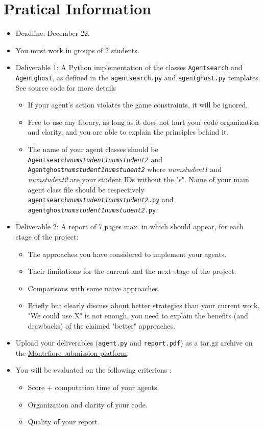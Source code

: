 \documentclass[12pt,a4paper,BCOR12mm, headexclude, footexclude, twoside, openright]{scrartcl}
\newcommand*{\TakeFourierOrnament}[1]{{%
\fontencoding{U}\fontfamily{futs}\selectfont\char#1}}
\newcommand*{\danger}{\TakeFourierOrnament{66}}
\numberwithin{equation}{section} %
\numberwithin{figure}{section} %
\numberwithin{table}{section} %
\begin{document}
\section{Pratical Information}
\begin{itemize}

    \item Deadline: December 22.
    \item You must work in groups of 2 students.
    \item Deliverable 1: A Python implementation of the classes \texttt{Agentsearch} and \texttt{Agentghost}, as defined in the  \texttt{agentsearch.py} and \texttt{agentghost.py} templates. See source code for more details
    \begin{itemize}
    	\item \danger If your agent's action violates the game constraints, it will be ignored,
        \item Free to use any library, as long as it does not hurt your code organization and clarity, and you are able to explain the principles behind it.
        \item The name of your agent classes should be \texttt{Agentsearch\emph{numstudent1}\emph{numstudent2}} and \texttt{Agentghost\emph{numstudent1}\emph{numstudent2}} where \emph{numstudent1} and \emph{numstudent2} are your student IDs without the "s". Name of your main agent class file should be respectively \texttt{agentsearch\emph{numstudent1}\emph{numstudent2}.py} and \texttt{agentghost\emph{numstudent1}\emph{numstudent2}.py}.
    \end{itemize}
    \item Deliverable 2: A report of 7 pages max. in which should appear, for each stage of the project:
    	\begin{itemize}
        	\item The approaches you have considered to implement your agents.
            \item Their limitations for the current and the next stage of the project.
            \item Comparisons with some naive approaches.
            \item Briefly but clearly discuss about better strategies than your current work. "We could use X" is not enough, you need to explain the benefits (and drawbacks) of the claimed "better" approaches.
        \end{itemize}
    \item Upload your deliverables (\texttt{agent.py} and \texttt{report.pdf}) as a tar.gz archive on the \href{http://submit.montefiore.ulg.ac.be/student/viewprojects/INFO8006}{Montefiore submission platform}.

	\item You will be evaluated on the following criterions :
    \begin{itemize}
		\item Score + computation time of your agents.
        \item Organization and clarity of your code.
        \item Quality of your report.
	\end{itemize}
\end{itemize}
\end{document}
